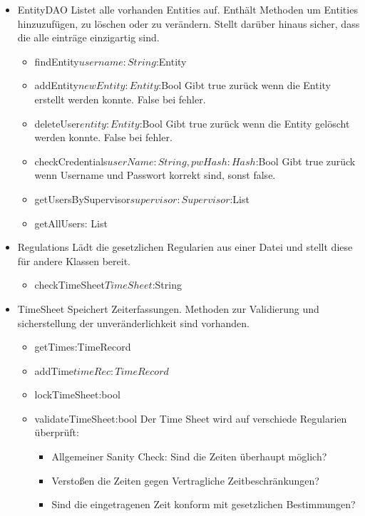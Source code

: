 \begin{itemize}
            \item{EntityDAO}
                Listet alle vorhanden Entities auf. Enthält Methoden um Entities hinzuzufügen, zu löschen oder zu verändern. Stellt darüber hinaus sicher, dass die alle einträge einzigartig sind.
                \begin{itemize}
                   \item{findEntity\(username:String\):Entity}
                   \item{addEntity\(newEntity:Entity\):Bool}
                    Gibt true zurück wenn die Entity erstellt werden konnte.
                    False bei fehler.
                   \item{deleteUser\(entity:Entity\):Bool}
                    Gibt true zurück wenn die Entity gelöscht werden konnte.
                    False bei fehler.
                   \item{checkCredentials\(userName:String, pwHash:Hash\):Bool}
                   Gibt true zurück wenn Username und Passwort korrekt sind, sonst false.
                   \item{getUsersBySupervisor\(supervisor:Supervisor\):List}
                   \item{getAllUsers\(\): List}
                \end{itemize}

            \item{Regulations}
                Lädt die gesetzlichen Regularien aus einer Datei und stellt diese für andere Klassen bereit.
                \begin{itemize}
                    \item{checkTimeSheet\(TimeSheet\):String}
                \end{itemize}

            \item{TimeSheet}
                Speichert Zeiterfassungen. Methoden zur Validierung und sicherstellung der unveränderlichkeit sind vorhanden.
                \begin{itemize}
                    \item{getTimes\(\):TimeRecord\[\]}
                    \item{addTime\(timeRec:TimeRecord\)}
                    \item{lockTimeSheet\(\):bool}
                    \item{validateTimeSheet\(\):bool}
                        Der Time Sheet wird auf verschiede Regularien überprüft:
                        \begin{itemize}
                            \item Allgemeiner Sanity Check: Sind die Zeiten überhaupt möglich?
                            \item Verstoßen die Zeiten gegen Vertragliche Zeitbeschränkungen?
                            \item Sind die eingetragenen Zeit konform mit gesetzlichen Bestimmungen?
                        \end{itemize}
                \end{itemize}


\end{itemize}
